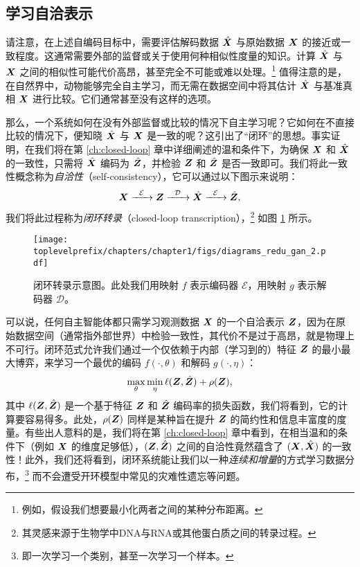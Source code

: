 \documentclass[../../book-main.tex]{subfiles}
\begin{document}
\subsection{学习自洽表示}
请注意，在上述自编码目标中，需要评估解码数据 $\hat {\bm{X}}$ 与原始数据 $\bm{X}$ 的接近或一致程度。这通常需要外部的监督或关于使用何种相似性度量的知识。计算 $\hat {\bm{X}}$ 与 $\bm{X}$ 之间的相似性可能代价高昂，甚至完全不可能或难以处理。\footnote{例如，假设我们想要最小化两者之间的某种分布距离。} 值得注意的是，在自然界中，动物能够完全自主学习，而无需在数据空间中将其估计 $\hat {\bm{X}}$ 与基准真相 $\bm{X}$ 进行比较。它们通常甚至没有这样的选项。

那么，一个系统如何在没有外部监督或比较的情况下自主学习呢？它如何在不直接比较的情况下，便知晓 $\hat {\bm{X}}$ 与 $\bm{X}$ 是一致的呢？这引出了“闭环”的思想。事实证明，在我们将在第 \ref{ch:closed-loop} 章中详细阐述的温和条件下，为确保 $\bm{X}$ 和 $\hat {\bm{X}}$ 的一致性，只需将 $\hat {\bm{X}}$ 编码为 $\hat {\bm{Z}}$，并检验 $\bm{Z}$ 和 $\hat {\bm{Z}}$ 是否一致即可。我们将此一致性概念称为{\em 自洽性}（self-consistency），它可以通过以下图示来说明：
\begin{equation}
    \bm{X}   \xrightarrow{\hspace{2mm} \mathcal{E}\hspace{2mm}} \bm{Z}  \xrightarrow{\hspace{2mm} \mathcal{D} \hspace{2mm}} \hat {\bm{X}} \xrightarrow{\hspace{2mm} \mathcal{E}\hspace{2mm}} \hat {\bm{Z}},
    \label{eqn:closed-loop}
\end{equation}
我们将此过程称为{\em 闭环转录}（closed-loop transcription），\footnote{其灵感来源于生物学中DNA与RNA或其他蛋白质之间的转录过程。} 如图 \ref{fig:closed-loop} 所示。

\begin{figure}[t]
    \centering
\texttt{[image: \\toplevelprefix/chapters/chapter1/figs/diagrams\_redu\_gan\_2.pdf]}
\caption{闭环转录示意图。此处我们用映射 $f$ 表示编码器 $\mathcal{E}$，用映射 $g$ 表示解码器 $\mathcal{D}$。}  \label{fig:closed-loop}
\end{figure}

可以说，任何自主智能体都只需学习观测数据 $\bm{X}$ 的一个自洽表示 $\bm{Z}$，因为在原始数据空间（通常指外部世界）中检验一致性，其代价不是过于高昂，就是物理上不可行。闭环范式允许我们通过一个仅依赖于内部（学习到的）特征 $\bm{Z}$ 的最小最大博弈，来学习一个最优的编码 $f(\cdot, \theta)$ 和解码 $g(\cdot, \eta)$：
\begin{equation}
\max_{\theta}\min_{\eta} \ell( \bm{Z}, \hat {\bm{Z}}) + \rho(\bm{Z}), 
   \label{eqn:closed-loop-objective}
\end{equation}
其中 $\ell( \bm{Z}, \hat {\bm{Z}})$ 是一个基于特征 $\bm{Z}$ 和 $\hat {\bm{Z}}$ 编码率的损失函数，我们将看到，它的计算要容易得多。此处，$\rho(\bm{Z})$ 同样是某种旨在提升 $\bm{Z}$ 的简约性和信息丰富度的度量。有些出人意料的是，我们将在第 \ref{ch:closed-loop} 章中看到，在相当温和的条件下（例如 $\bm{X}$ 的维度足够低），$(\bm{Z}, \hat {\bm{Z}})$ 之间的自洽性竟然蕴含了 $(\bm{X}, \hat {\bm{X}})$ 的一致性！此外，我们还将看到，闭环系统能让我们以一种{\em 连续和增量}的方式学习数据分布，\footnote{即一次学习一个类别，甚至一次学习一个样本。} 而不会遭受开环模型中常见的灾难性遗忘等问题。
\end{document}
